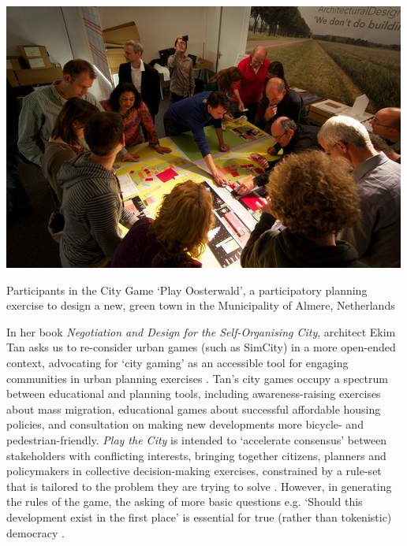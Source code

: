 \documentclass[nofonts,nols,justified,nobib]{tufte-book}
\begin{document}
\begin{marginfigure}
\includegraphics[width=\textwidth]{img/1/play-oosterwald.jpg}
\caption{Participants in the City Game `Play Oosterwald', a participatory planning exercise to design a new, green town in the Municipality of Almere, Netherlands \cite{play_the_city_play_2013}}
\end{marginfigure}

In her book \emph{Negotiation and Design for the Self-Organising City}, architect Ekim Tan asks us to re-consider urban games (such as SimCity) in a more open-ended context, advocating for `city gaming' as an accessible tool for engaging communities in urban planning exercises \cite{tan_negotiation_2014}. Tan's city games occupy a spectrum between educational and planning tools, including awareness-raising exercises about mass migration, educational games about successful affordable housing policies, and consultation on making new developments more bicycle- and pedestrian-friendly. \emph{Play the City} is intended to `accelerate consensus' between stakeholders with conflicting interests, bringing together citizens, planners and policymakers in collective decision-making exercises, constrained by a rule-set that is tailored to the problem they are trying to solve \cite{tan_city_2017}. However, in generating the rules of the game, the asking of more basic questions e.g. `Should this development exist in the first place' is essential for true (rather than tokenistic) democracy \cite{shaw_informational_2017}.
\end{document}

